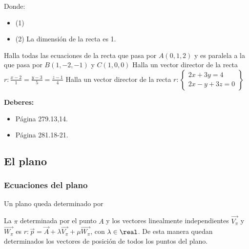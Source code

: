 Donde:
\begin{itemize}
    \item (1) 
    \item (2) 
    \subitem \obs {}
    \subitem \obs La dimensión de la recta es 1.
\end{itemize}

\begin{problem}
    \ppart 
    Halla todas las ecuaciones de la recta que pasa por $A(0,1,2)$ y es paralela a la que pasa por $B(1,-2,-1)$ y $C(1,0,0)$
    \ppart 
    Halla un vector director de la recta $r:\displaystyle\frac{x-2}{1} = \frac{y-3}{5} = \frac{z-1}{4}$
    \ppart 
    Halla un vector director de la recta $r:\displaystyle\left\{\begin{array}{c} 2x+3y=4\\2x-y+3z=0\end{array}\right\}$
    \solution

\end{problem}

\textbf{Deberes:} 
\begin{itemize}
  \item Página 279.13,14.
  \item Página 281.18-21.
\end{itemize}

\subsection{El plano}

\subsubsection{Ecuaciones del plano}

Un plano queda determinado por 

La 
%
%
$\pi$ determinada por el punto $A$ y los vectores linealmente independientes $\vec{V_{\pi}}$ y $\vec{W_{\pi}}$  es $r : \vec{p} = \vec{A} + \lambda \vec{V_{\pi}} + \mu\vec{W_{\pi}}$, con $\lambda\in\real$. De esta manera quedan determinados los vectores de posición de todos los puntos del plano.

